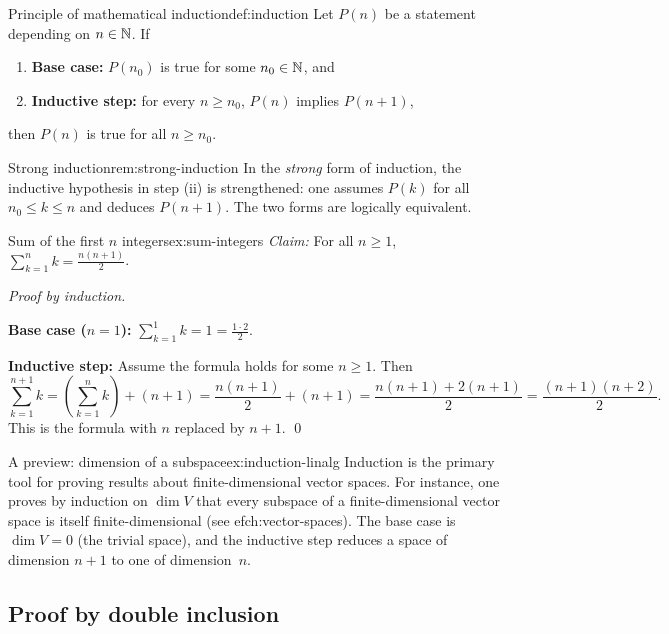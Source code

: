 \begin{definition}{Principle of mathematical induction}{def:induction}
Let $P(n)$ be a statement depending on $n\in{\mathbb{N}}$. If
\begin{enumerate}[label=(\roman*)]
  \item \textbf{Base case:} $P(n_0)$ is true for some $n_0\in{\mathbb{N}}$, and
  \item \textbf{Inductive step:} for every $n\geq n_0$, $P(n)$ implies
    $P(n+1)$,
\end{enumerate}
then $P(n)$ is true for all $n\geq n_0$.
\end{definition}

\begin{remark}{Strong induction}{rem:strong-induction}
In the \emph{strong} form of induction, the inductive hypothesis in step
(ii) is strengthened: one assumes $P(k)$ for all $n_0\leq k\leq n$ and
deduces $P(n+1)$. The two forms are logically equivalent.
\end{remark}

\begin{example}{Sum of the first $n$ integers}{ex:sum-integers}
\emph{Claim:} For all $n\geq 1$,
$\displaystyle\sum_{k=1}^{n}k = \frac{n(n+1)}{2}$.

\emph{Proof by induction.}

\textbf{Base case ($n=1$):}
$\displaystyle\sum_{k=1}^{1}k = 1 = \frac{1\cdot 2}{2}$. \checkmark

\textbf{Inductive step:} Assume the formula holds for some $n\geq 1$.
Then
\[
  \sum_{k=1}^{n+1}k = \left(\sum_{k=1}^{n}k\right) + (n+1)
  = \frac{n(n+1)}{2} + (n+1)
  = \frac{n(n+1)+2(n+1)}{2}
  = \frac{(n+1)(n+2)}{2}.
\]
This is the formula with $n$ replaced by $n+1$. \qed
\end{example}

\begin{example}{A preview: dimension of a subspace}{ex:induction-linalg}
Induction is the primary tool for proving results about finite-dimensional
vector spaces. For instance, one proves by induction on $\dim V$ that
every subspace of a finite-dimensional vector space is itself
finite-dimensional (see 
ef{ch:vector-spaces}). The base case is
$\dim V = 0$ (the trivial space), and the inductive step reduces a space
of dimension $n+1$ to one of dimension~$n$.
\end{example}

\subsection{Proof by double inclusion}\label{subsec:double-inclusion}

